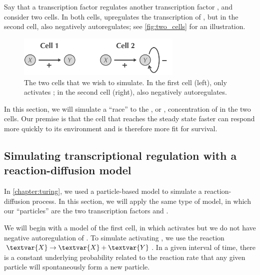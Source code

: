 Say that a transcription factor  regulates another transcription factor , and consider two cells. In both cells,  upregulates the transcription of , but in the second cell,  also negatively autoregulates; see \autoref{fig:two_cells} for an illustration.\\

\begin{figure}[h]
\centering
\mySfFamily
\includegraphics[width = 0.7\textwidth]{../images/two_cells.png}
\caption{The two cells that we wish to simulate. In the first cell (left),  only activates ; in the second cell (right),  also negatively autoregulates.}
\label{fig:two_cells}
\end{figure}

In this section, we will simulate a ``race'' to the , or , concentration of  in the two cells. Our premise is that the cell that reaches the steady state faster can respond more quickly to its environment and is therefore more fit for survival.

\FloatBarrier
{}
\subsection{Simulating transcriptional regulation with a reaction-diffusion model}

In \autoref{chapter:turing}, we used a particle-based model to simulate a reaction-diffusion process. In this section, we will apply the same type of model, in which our ``particles'' are the two transcription factors  and .

We will begin with a model of the first cell, in which  activates  but we do not have negative autoregulation of . To simulate  activating , we use the reaction $\textvar{X} \rightarrow \textvar{X} + \textvar{Y}$. In a given interval of time, there is a constant underlying probability related to the reaction rate that any given  particle will spontaneously form a new  particle.

